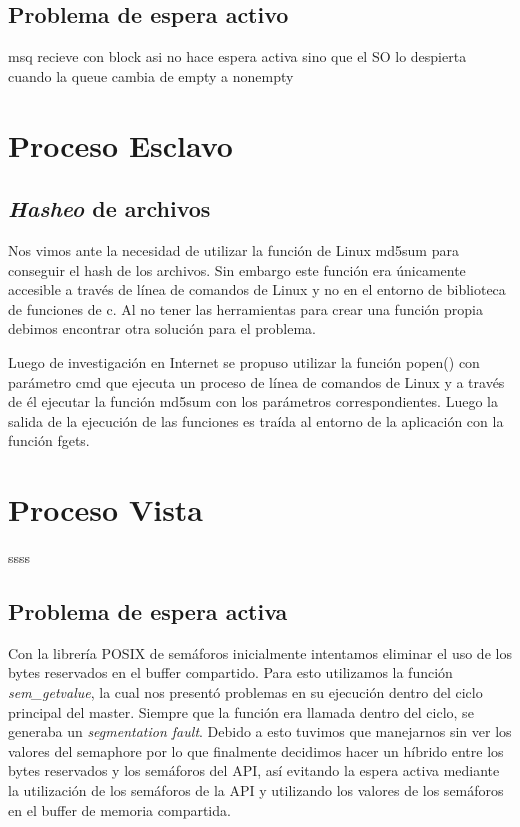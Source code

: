\documentclass[10pt,a4paper]{report}
\begin{document}
\subsection{Problema de espera activo}
msq recieve con block asi no hace espera activa sino que el SO lo despierta cuando la queue cambia de empty a nonempty
\section{Proceso Esclavo}
\subsection{\textit{Hasheo} de archivos}
Nos vimos ante la necesidad de utilizar la función de Linux md5sum para conseguir el hash de los archivos. Sin embargo este función
era únicamente accesible a través de línea de comandos de Linux y no en el entorno de biblioteca de funciones de c. Al no tener las
herramientas para crear una función propia debimos encontrar otra solución para el problema.

Luego de investigación en Internet se propuso utilizar la función popen() con parámetro cmd que ejecuta un proceso de línea de comandos
de Linux y a través de él ejecutar la función md5sum con los parámetros correspondientes. Luego la salida de la ejecución de las funciones
es traída al entorno de la aplicación con la función fgets.
\section{Proceso Vista}
ssss
\subsection{Problema de espera activa}
	Con la librería POSIX de semáforos inicialmente intentamos eliminar el uso de los bytes reservados en el buffer compartido. Para esto utilizamos la función \textit{sem\_getvalue}, la cual nos presentó problemas en su ejecución dentro del ciclo principal del master. Siempre que la función era llamada dentro del ciclo, se generaba un \textit{segmentation fault}. Debido a esto tuvimos que manejarnos sin ver los valores del semaphore por lo que finalmente decidimos hacer un híbrido entre los bytes reservados y los semáforos del API, así evitando la espera activa mediante la utilización de los semáforos de la API y utilizando los valores de los semáforos en el buffer de memoria compartida.

\end{document}
